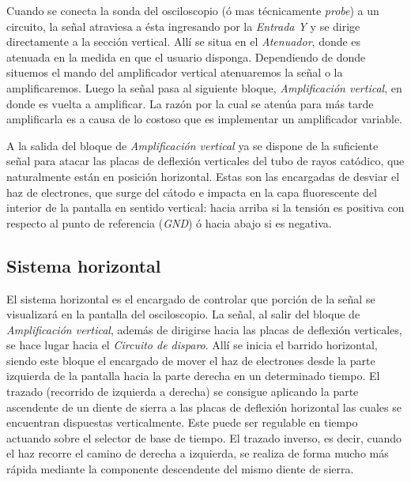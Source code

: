 \documentclass{article}
\begin{document}
	Cuando se conecta la sonda del osciloscopio (ó mas técnicamente \textit{probe}) a un circuito, la señal atraviesa a ésta ingresando por la \textit{Entrada Y} y se dirige directamente a la sección vertical. Allí se situa en el \textit{Atenuador}, donde es atenuada en la medida en que el usuario disponga. Dependiendo de donde situemos el mando del amplificador vertical atenuaremos la señal o la amplificaremos. Luego la señal pasa al siguiente bloque, \textit{Amplificación vertical}, en donde es vuelta a amplificar. La razón por la cual se atenúa para más tarde amplificarla es a causa de lo costoso que es implementar un amplificador variable.
	\par
	A la salida del bloque de \textit{Amplificación vertical} ya se dispone de la suficiente señal para atacar las placas de deflexión verticales del tubo de rayos catódico, que naturalmente están en posición horizontal. Estas son las encargadas de desviar el haz de electrones, que surge del cátodo e impacta en la capa fluorescente del interior de la pantalla en sentido vertical: hacia arriba si la tensión es positiva con respecto al punto de referencia (\textit{GND}) ó hacia abajo si es negativa.
	\bigskip
	


\subsection{Sistema horizontal}
	
	El sistema horizontal es el encargado de controlar que porción de la señal se visualizará en la pantalla del osciloscopio. La señal, al salir del bloque de \textit{Amplificación vertical}, además de dirigirse hacia las placas de deflexión verticales, se hace lugar hacia el \textit{Circuito de disparo}. Allí se inicia el barrido horizontal, siendo este bloque el encargado de mover el haz de electrones desde la parte izquierda de la pantalla hacia la parte derecha en un determinado tiempo. El trazado (recorrido de izquierda a derecha) se consigue aplicando la parte ascendente de un diente de sierra a las placas de deflexión horizontal las cuales se encuentran dispuestas verticalmente. Este puede ser regulable en tiempo actuando sobre el selector de base de tiempo. El trazado inverso, es decir, cuando el haz recorre el camino de derecha a izquierda, se realiza de forma mucho más rápida mediante la componente descendente del mismo diente de sierra.
	\bigskip\bigskip
\end{document}
